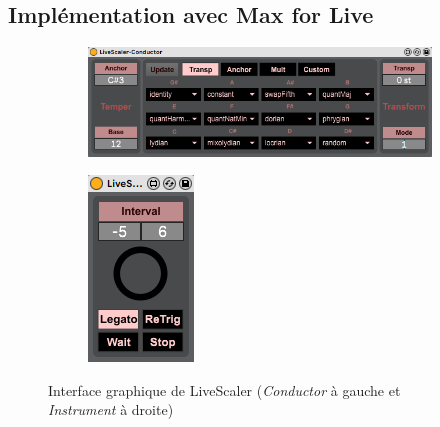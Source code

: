 \subsection{Implémentation avec Max for Live}
\begin{figure}[htbp]
  \centering
  \begin{subfigure}{0.83\textwidth}
    \includegraphics{Figures/LS-Conductor-UI.png}
  \end{subfigure}
  \begin{subfigure}{0.15\textwidth}
    \includegraphics{Figures/LS-Instrument-UI.png}
  \end{subfigure}
  
  \caption{Interface graphique de LiveScaler (\emph{Conductor} à gauche  et  \emph{Instrument} à droite) }
  \label{fig:LiveScalerUI}
\end{figure}

